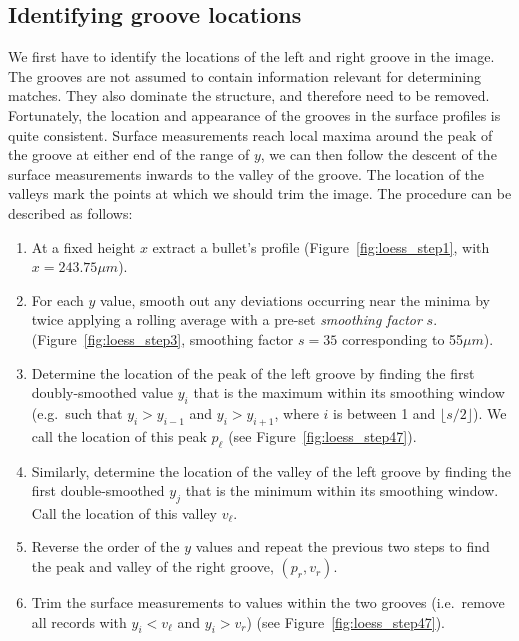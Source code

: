 \documentclass[aoas, preprint]{imsart}\usepackage[]{graphicx}\usepackage[]{color}
\begin{document}
\subsection{Identifying groove locations}
We first have to identify the locations of the left and right  groove in the image. The grooves are not assumed to contain information relevant for determining matches. They also dominate the structure, and therefore need  to be removed.  
Fortunately, the location and appearance of the grooves in the surface profiles is quite consistent.
Surface measurements reach local maxima around the peak of the groove at either end of the range of $y$, we can then follow the descent of the surface measurements inwards to the valley of the groove. 
The location of the valleys  mark the points at which we should trim the image. The procedure can be described as follows:

\begin{enumerate}
    \item At a fixed height $x$ extract a bullet's profile (Figure~\ref{fig:loess_step1}, with $x = 243.75\mu m$).
    \item For each $y$ value, smooth out any deviations occurring near the minima by twice applying a rolling average with a pre-set \emph{smoothing factor} $s$. (Figure~\ref{fig:loess_step3}, smoothing factor $s = 35$ corresponding to 55$\mu m$).
    \item Determine the location of the peak of the left groove by finding the first doubly-smoothed value $y_i$ that is the maximum within its smoothing window (e.g.\ such that $y_i > y_{i - 1}$ and $y_i > y_{i + 1}$, where $i$ is between 1  and $\lfloor s/2 \rfloor$). We call the location of this peak $p_{\ell}$ (see Figure~\ref{fig:loess_step47}). 
    \item Similarly, determine the location of the valley of the left groove by finding the first double-smoothed $y_j$ that is the minimum within its smoothing window. Call the location of this valley $v_{\ell}$.
    \item Reverse the order of the $y$ values and repeat the previous two steps to find the peak and valley of the right groove, $(p_{r}, v_{r})$.
    \item Trim the surface measurements to values within the two grooves (i.e.\ remove all records with $y_i < v_{\ell}$ and $y_i > v_{r}$) (see Figure~\ref{fig:loess_step47}).
\end{enumerate}
\end{document}
